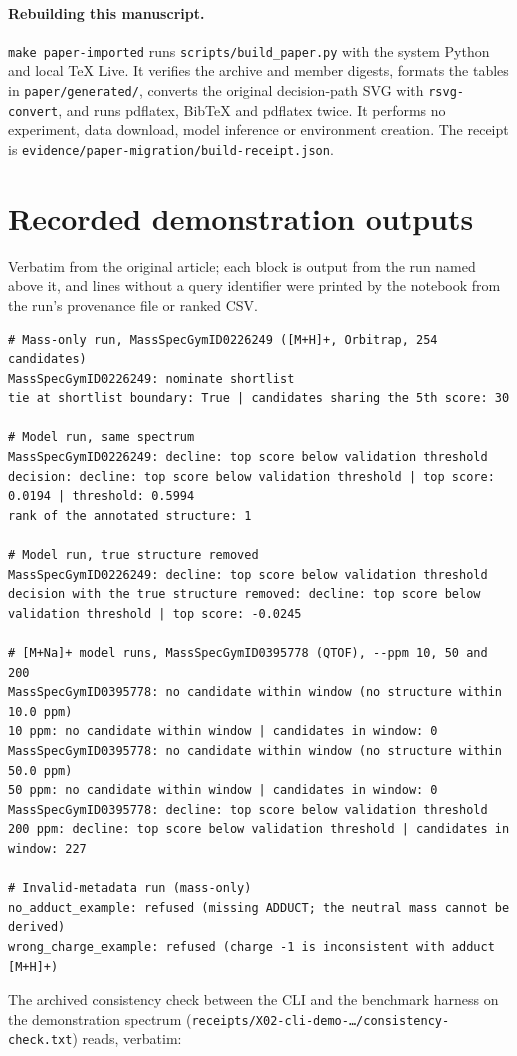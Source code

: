 \documentclass[11pt]{article}
\newcommand{\m}[1]{\texttt{#1}}
\begin{document}
\paragraph{Rebuilding this manuscript.} \m{make paper-imported} runs \m{scripts/build\_paper.py} with the system Python and local
TeX Live. It verifies the archive and member digests, formats the tables in \m{paper/generated/}, converts the original
decision-path SVG with \m{rsvg-convert}, and runs pdflatex, BibTeX and pdflatex twice. It performs no experiment, data download,
model inference or environment creation. The receipt is \m{evidence/paper-migration/build-receipt.json}.

\section{Recorded demonstration outputs}\label{app:demo}
Verbatim from the original article; each block is output from the run named above it, and lines without a query identifier were
printed by the notebook from the run's provenance file or ranked CSV.
\begin{lstlisting}[basicstyle=\ttfamily\scriptsize]
# Mass-only run, MassSpecGymID0226249 ([M+H]+, Orbitrap, 254 candidates)
MassSpecGymID0226249: nominate shortlist
tie at shortlist boundary: True | candidates sharing the 5th score: 30

# Model run, same spectrum
MassSpecGymID0226249: decline: top score below validation threshold
decision: decline: top score below validation threshold | top score: 0.0194 | threshold: 0.5994
rank of the annotated structure: 1

# Model run, true structure removed
MassSpecGymID0226249: decline: top score below validation threshold
decision with the true structure removed: decline: top score below validation threshold | top score: -0.0245

# [M+Na]+ model runs, MassSpecGymID0395778 (QTOF), --ppm 10, 50 and 200
MassSpecGymID0395778: no candidate within window (no structure within 10.0 ppm)
10 ppm: no candidate within window | candidates in window: 0
MassSpecGymID0395778: no candidate within window (no structure within 50.0 ppm)
50 ppm: no candidate within window | candidates in window: 0
MassSpecGymID0395778: decline: top score below validation threshold
200 ppm: decline: top score below validation threshold | candidates in window: 227

# Invalid-metadata run (mass-only)
no_adduct_example: refused (missing ADDUCT; the neutral mass cannot be derived)
wrong_charge_example: refused (charge -1 is inconsistent with adduct [M+H]+)
\end{lstlisting}
The archived consistency check between the CLI and the benchmark harness on the demonstration spectrum
(\m{receipts/X02-cli-demo-\ldots/consistency-check.txt}) reads, verbatim:

\end{document}
